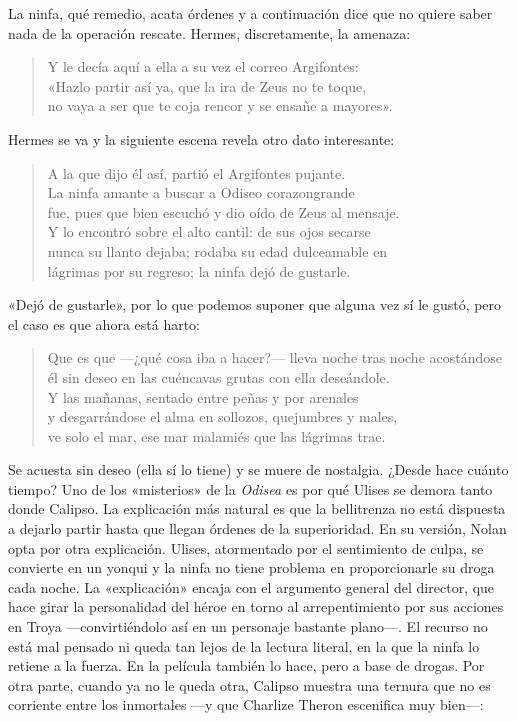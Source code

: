 \documentclass[11pt,a4paper]{article}
\begin{document}
La ninfa, qué remedio, acata órdenes y a continuación dice que no quiere saber nada de la operación rescate. Hermes, discretamente, la amenaza:

\begin{verse}
Y le decía aquí a ella a su vez el correo Argifontes:\\
«Hazlo partir así ya, que la ira de Zeus no te toque,\\
no vaya a ser que te coja rencor y se ensañe a mayores».
\end{verse}

Hermes se va y la siguiente escena revela otro dato interesante:

\begin{verse}
A la que dijo él así, partió el Argifontes pujante.\\
La ninfa amante a buscar a Odiseo corazongrande\\
fue, pues que bien escuchó y dio oído de Zeus al mensaje.\\
Y lo encontró sobre el alto cantil: de sus ojos secarse\\
nunca su llanto dejaba; rodaba su edad dulceamable en\\
lágrimas por su regreso; la ninfa dejó de gustarle.
\end{verse}

«Dejó de gustarle», por lo que podemos suponer que alguna vez sí le gustó, pero el caso es que ahora está harto:

\begin{verse}
Que es que ---¿qué cosa iba a hacer?--- lleva noche tras noche acostándose\\
él sin deseo en las cuéncavas grutas con ella deseándole.\\
Y las mañanas, sentado entre peñas y por arenales\\
y desgarrándose el alma en sollozos, quejumbres y males,\\
ve solo el mar, ese mar malamiés que las lágrimas trae.
\end{verse}

Se acuesta sin deseo (ella sí lo tiene) y se muere de nostalgia. ¿Desde hace cuánto tiempo? Uno de los «misterios» de la \emph{Odisea} es por qué Ulises se demora tanto donde Calipso. La explicación más natural es que la bellitrenza no está dispuesta a dejarlo partir hasta que llegan órdenes de la superioridad. En su versión, Nolan opta por otra explicación. Ulises, atormentado por el sentimiento de culpa, se convierte en un yonqui y la ninfa no tiene problema en proporcionarle su droga cada noche. La «explicación» encaja con el argumento general del director, que hace girar la personalidad del héroe en torno al arrepentimiento por sus acciones en Troya ---convirtiéndolo así en un personaje bastante plano---. El recurso no está mal pensado ni queda tan lejos de la lectura literal, en la que la ninfa lo retiene a la fuerza. En la película también lo hace, pero a base de drogas. Por otra parte, cuando ya no le queda otra, Calipso muestra una ternura que no es corriente entre los inmortales ---y que Charlize Theron escenifica muy bien---:
\end{document}
